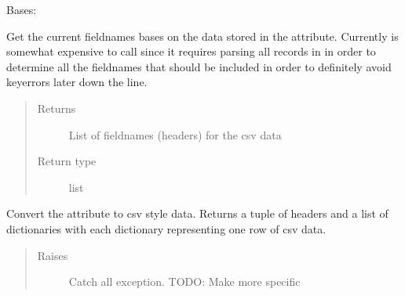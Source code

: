 \documentclass[letterpaper,10pt,english]{sphinxmanual}
\begin{document}

\begin{fulllineitems}
\label{\detokenize{polo.utils:polo.utils.io_utils.RunCsvWriter}}
Bases: {\hyperref[\detokenize{polo.utils:polo.utils.io_utils.RunSerializer}]{}}

\begin{fulllineitems}
\label{\detokenize{polo.utils:polo.utils.io_utils.RunCsvWriter.fieldnames}}
Get the current fieldnames bases on the data stored in the
 attribute. Currently is somewhat expensive to call since it
requires parsing all records in  in order to determine all the
fieldnames that should be included in order to definitely avoid
keyerrors later down the line.
\begin{quote}\begin{description}
\item[{Returns}] \leavevmode
List of fieldnames (headers) for the csv data

\item[{Return type}] \leavevmode
list

\end{description}\end{quote}

\end{fulllineitems}


\begin{fulllineitems}
\label{\detokenize{polo.utils:polo.utils.io_utils.RunCsvWriter.get_csv_data}}
Convert the  attribute to csv style data. Returns a tuple of
headers and a list of dictionaries with each dictionary representing
one row of csv data.
\begin{quote}\begin{description}
\item[{Raises}] \leavevmode
{} \textendash{} Catch all exception. TODO: Make more specific


\end{description}
\end{quote}
\end{fulllineitems}
\end{fulllineitems}
\end{document}
